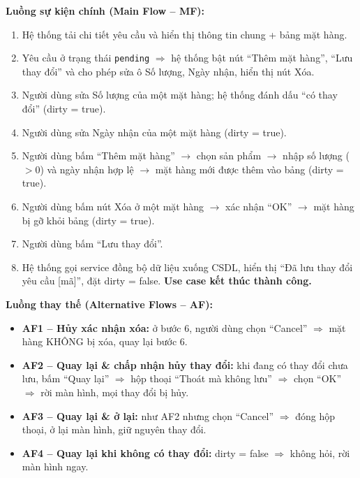 \documentclass[12pt,a4paper]{article}
\begin{document}
\noindent\textbf{Luồng sự kiện chính (Main Flow -- MF):}
\begin{enumerate}[leftmargin=*]
  \item Hệ thống tải chi tiết yêu cầu và hiển thị thông tin chung + bảng mặt hàng.
  \item Yêu cầu ở trạng thái \texttt{pending} $\Rightarrow$ hệ thống bật nút ``Thêm mặt hàng'', ``Lưu thay đổi'' và cho phép sửa ô Số lượng, Ngày nhận, hiển thị nút Xóa.
  \item Người dùng sửa Số lượng của một mặt hàng; hệ thống đánh dấu ``có thay đổi'' (dirty = true).
  \item Người dùng sửa Ngày nhận của một mặt hàng (dirty = true).
  \item Người dùng bấm ``Thêm mặt hàng'' $\to$ chọn sản phẩm $\to$ nhập số lượng ($> 0$) và ngày nhận hợp lệ $\to$ mặt hàng mới được thêm vào bảng (dirty = true).
  \item Người dùng bấm nút Xóa ở một mặt hàng $\to$ xác nhận ``OK'' $\to$ mặt hàng bị gỡ khỏi bảng (dirty = true).
  \item Người dùng bấm ``Lưu thay đổi''.
  \item Hệ thống gọi service đồng bộ dữ liệu xuống CSDL, hiển thị ``Đã lưu thay đổi yêu cầu [mã]'', đặt dirty = false. \textbf{Use case kết thúc thành công.}
\end{enumerate}

\noindent\textbf{Luồng thay thế (Alternative Flows -- AF):}
\begin{itemize}[leftmargin=*]
  \item \textbf{AF1 -- Hủy xác nhận xóa:} ở bước 6, người dùng chọn ``Cancel'' $\Rightarrow$ mặt hàng KHÔNG bị xóa, quay lại bước 6.
  \item \textbf{AF2 -- Quay lại \& chấp nhận hủy thay đổi:} khi đang có thay đổi chưa lưu, bấm ``Quay lại'' $\Rightarrow$ hộp thoại ``Thoát mà không lưu'' $\Rightarrow$ chọn ``OK'' $\Rightarrow$ rời màn hình, mọi thay đổi bị hủy.
  \item \textbf{AF3 -- Quay lại \& ở lại:} như AF2 nhưng chọn ``Cancel'' $\Rightarrow$ đóng hộp thoại, ở lại màn hình, giữ nguyên thay đổi.
  \item \textbf{AF4 -- Quay lại khi không có thay đổi:} dirty = false $\Rightarrow$ không hỏi, rời màn hình ngay.
\end{itemize}
\end{document}
